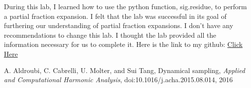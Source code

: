 \documentclass[12pt]{report}
\begin{document}
During this lab, I learned how to use the python function, sig.residue, to perform a partial fraction expansion. I felt that the lab was successful in its goal of furthering our understanding of partial fraction expansions. I don't have any recommendations to change this lab. I thought the lab provided all the information necessary for us to complete it. Here is the link to my github: \href{https://github.com/JMac1999}{Click Here}

\newpage


\begin{thebibliography}{111}

A. Aldroubi, C. Cabrelli, U. Molter, and Sui Tang,
Dynamical sampling, 
{\it  Applied and Computational Harmonic Analysis}, doi:10.1016/j.acha.2015.08.014, 2016


\end{thebibliography}
\end{document}
